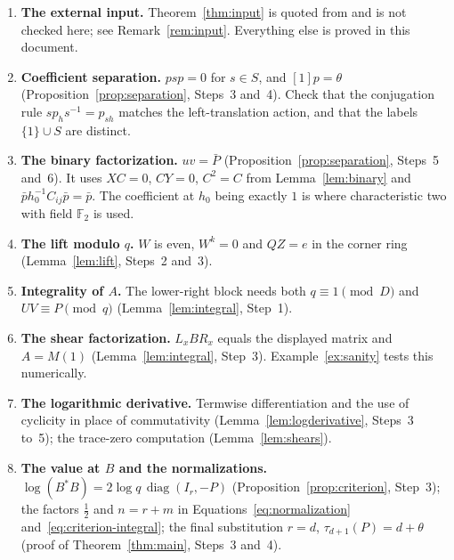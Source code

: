 \documentclass[11pt]{article}
\theoremstyle{remark}
\numberwithin{equation}{section}
\newcommand{\F}{\mathbb F}
\newcommand{\diag}{\operatorname{diag}}
\begin{document}
\begin{enumerate}[leftmargin=2em]
\item \textbf{The external input.} Theorem~\ref{thm:input} is quoted from \cite{CharacteristicTwo} and is not checked here; see Remark~\ref{rem:input}. Everything else is proved in this document.
\item \textbf{Coefficient separation.} $psp=0$ for $s\in S$, and $[1]p=\theta$ (Proposition~\ref{prop:separation}, Steps~3 and~4). Check that the conjugation rule $sp_hs^{-1}=p_{sh}$ matches the left-translation action, and that the labels $\{1\}\cup S$ are distinct.
\item \textbf{The binary factorization.} $uv=\bar P$ (Proposition~\ref{prop:separation}, Steps~5 and~6). It uses $XC=0$, $CY=0$, $C^2=C$ from Lemma~\ref{lem:binary} and $\bar ph_0^{-1}C_{ij}\bar p=\bar p$. The coefficient at $h_0$ being exactly $1$ is where characteristic two with field $\F_2$ is used.
\item \textbf{The lift modulo $q$.} $W$ is even, $W^k=0$ and $QZ=e$ in the corner ring (Lemma~\ref{lem:lift}, Steps~2 and~3).
\item \textbf{Integrality of $A$.} The lower-right block needs both $q\equiv1\pmod D$ and $UV\equiv P\pmod q$ (Lemma~\ref{lem:integral}, Step~1).
\item \textbf{The shear factorization.} $L_xBR_x$ equals the displayed matrix and $A=M(1)$ (Lemma~\ref{lem:integral}, Step~3). Example~\ref{ex:sanity} tests this numerically.
\item \textbf{The logarithmic derivative.} Termwise differentiation and the use of cyclicity in place of commutativity (Lemma~\ref{lem:logderivative}, Steps~3 to~5); the trace-zero computation (Lemma~\ref{lem:shears}).
\item \textbf{The value at $B$ and the normalizations.} $\log(B^*B)=2\log q\,\diag(I_r,-P)$ (Proposition~\ref{prop:criterion}, Step~3); the factors $\tfrac12$ and $n=r+m$ in Equations~\eqref{eq:normalization} and~\eqref{eq:criterion-integral}; the final substitution $r=d$, $\tau_{d+1}(P)=d+\theta$ (proof of Theorem~\ref{thm:main}, Steps~3 and~4).
\end{enumerate}

\begingroup
\raggedright


\endgroup
\end{document}
